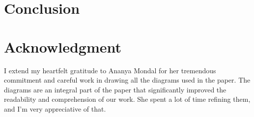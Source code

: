 \documentclass{article}
\begin{document}
\section{Conclusion}

\section{Acknowledgment}
I extend my heartfelt gratitude to Ananya Mondal for her tremendous commitment and careful work in drawing all the diagrams used in the paper. The diagrams are an integral part of the paper that significantly improved the readability and comprehension of our work. She spent a lot of time refining them, and I'm very appreciative of that.





\end{document}

